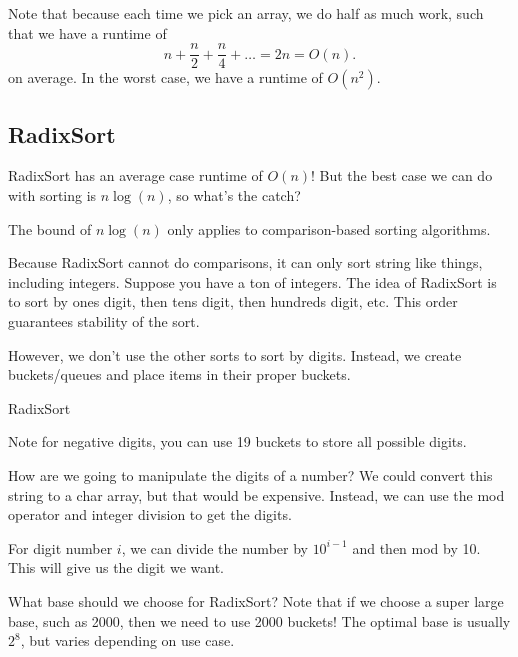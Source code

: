 \documentclass[a4paper]{article}
\begin{document}
Note that because each time we pick an array, we do half as much work, such that we have a runtime of \[
	n + \frac{n}{2} + \frac{n}{4} + \ldots = 2n = O(n)
.\] on average. In the worst case, we have a runtime of \( O(n^2) \).


\subsection{RadixSort}

RadixSort has an average case runtime of \( O(n) \)! But the best case we can do with sorting is \( n\log (n) \), so what's the catch?

\begin{note}
	The bound of \( n\log (n) \) only applies to comparison-based sorting algorithms.
\end{note}

Because RadixSort cannot do comparisons, it can only sort string like things, including integers. Suppose you have a ton of integers. The idea of RadixSort is to sort by ones digit, then tens digit, then hundreds digit, etc. This order guarantees stability of the sort.

However, we don't use the other sorts to sort by digits. Instead, we create buckets/queues and place items in their proper buckets.

\begin{algorithm}[H]
	\caption{RadixSort}
\end{algorithm}

\begin{note}
	Note for negative digits, you can use 19 buckets to store all possible digits. 
\end{note}

How are we going to manipulate the digits of a number? We could convert this string to a char array, but that would be expensive. Instead, we can use the mod operator and integer division to get the digits.

\begin{property}
	For digit number \( i \), we can divide the number by \( 10^{i-1} \) and then mod by 10. This will give us the digit we want.
\end{property}

What base should we choose for RadixSort? Note that if we choose a super large base, such as 2000, then we need to use 2000 buckets! The optimal base is usually \( 2^8 \), but varies depending on use case.
\end{document}
